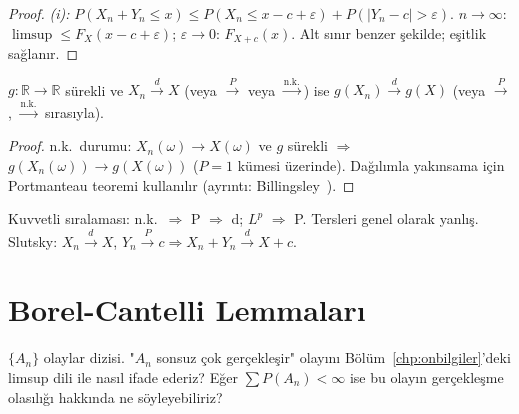 \begin{proof}
\textit{(i):} $P(X_n + Y_n \leq x) \leq P(X_n \leq x - c + \varepsilon) + P(|Y_n - c| > \varepsilon)$.
$n\to\infty$: $\limsup \leq F_X(x-c+\varepsilon)$; $\varepsilon\to 0$: $F_{X+c}(x)$.
Alt sınır benzer şekilde; eşitlik sağlanır.
\end{proof}

\begin{teorem}
\label{thm:surekli_haritalama}
$g : \mathbb{R} \to \mathbb{R}$ sürekli ve $X_n \xrightarrow{d} X$ (veya $\xrightarrow{P}$ veya $\xrightarrow{\text{n.k.}}$)
ise $g(X_n) \xrightarrow{d} g(X)$ (veya $\xrightarrow{P}$, $\xrightarrow{\text{n.k.}}$ sırasıyla).
\end{teorem}

\begin{proof}
n.k.\ durumu: $X_n(\omega) \to X(\omega)$ ve $g$ sürekli $\Rightarrow$ $g(X_n(\omega)) \to g(X(\omega))$
($P = 1$ kümesi üzerinde).
Dağılımla yakınsama için Portmanteau teoremi kullanılır (ayrıntı: Billingsley~\cite{Billingsley1995}).
\end{proof}

\begin{mikroozet}
Kuvvetli sıralaması: n.k.\ $\Rightarrow$ P $\Rightarrow$ d; $L^p$ $\Rightarrow$ P.
Tersleri genel olarak yanlış. Slutsky: $X_n \xrightarrow{d} X$, $Y_n \xrightarrow{P} c \Rightarrow X_n+Y_n \xrightarrow{d} X+c$.
\end{mikroozet}

\section{Borel-Cantelli Lemmaları}
\label{sec:borel_cantelli}

\begin{kesif}
$\{A_n\}$ olaylar dizisi. "$A_n$ sonsuz çok gerçekleşir" olayını
Bölüm~\ref{chp:onbilgiler}'deki limsup dili ile nasıl ifade ederiz?
Eğer $\sum P(A_n) < \infty$ ise bu olayın gerçekleşme olasılığı hakkında
ne söyleyebiliriz?
\end{kesif}

